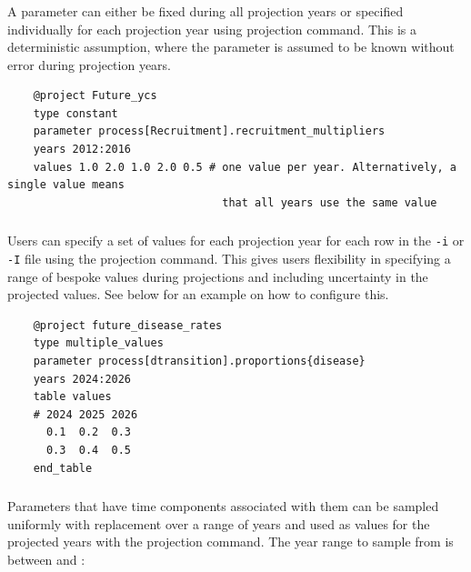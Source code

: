 \label{sec:ProjectionMethods}

\subsubsection{}
\label{sec:Project-Constant}

A parameter can either be fixed during all projection years or specified individually for each projection year using  projection command. This is a deterministic assumption, where the parameter is assumed to be known without error during projection years.

{\small{\begin{verbatim}
	@project Future_ycs
	type constant
	parameter process[Recruitment].recruitment_multipliers
	years 2012:2016
	values 1.0 2.0 1.0 2.0 0.5 # one value per year. Alternatively, a single value means 
	                             that all years use the same value
\end{verbatim}}}

\subsubsection{}
\label{sec:Project-MultipleValues}

Users can specify a set of values for each projection year for each row in the \texttt{-i} or \texttt{-I} file using the  projection command. This gives users flexibility in specifying a range of bespoke values during projections and including uncertainty in the projected values. See below for an example on how to configure this.

{\small{\begin{verbatim}
	@project future_disease_rates
	type multiple_values
	parameter process[dtransition].proportions{disease}  
	years 2024:2026
	table values
	# 2024 2025 2026
	  0.1  0.2  0.3
	  0.3  0.4  0.5
	end_table
\end{verbatim}}}

\subsubsection{}
\label{sec:Project-EmpiricalSampling}

Parameters that have time components associated with them can be sampled uniformly with replacement over a range of years and used as values for the projected years with the  projection command. The year range to sample from is between  and :

